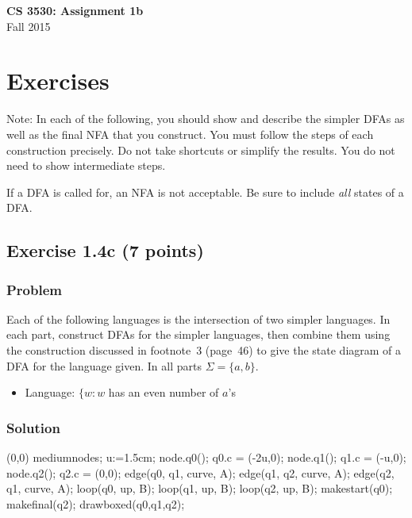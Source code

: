 \documentclass{article}
\begin{document}
\begin{empfile}

\begin{center}
\textbf{\Large CS 3530: Assignment 1b} \\[2mm]
Fall 2015
\end{center}

\raggedright

\section*{Exercises}

Note: In each of the following, you should show and describe the
simpler DFAs as well as the final NFA that you construct. You must
follow the steps of each construction precisely. Do not take
shortcuts or simplify the results. You do not need to show
intermediate steps.

If a DFA is called for, an NFA is not acceptable. Be sure to include
\textit{all} states of a DFA.

\subsection*{Exercise 1.4c (7 points)}

\subsubsection*{Problem}

Each of the following languages is the intersection of two simpler
languages. In each part, construct DFAs for the simpler languages,
then combine them using the construction discussed in footnote~3
(page~46) to give the state diagram of a DFA for the language given.
In all parts $\Sigma=\{a,b\}$.

\begin{itemize}
\item Language: $\{w:w$ has an even number of $a$'s
\end{itemize}

\subsubsection*{Solution}
	\begin{center}
	\begin{emp}(0,0)
	mediumnodes;
	u:=1.5cm;
	node.q0(); q0.c = (-2u,0);
	node.q1(); q1.c = (-u,0);
	node.q2(); q2.c = (0,0);
	edge(q0, q1, curve, A);
	edge(q1, q2, curve, A);
	edge(q2, q1, curve, A);
	loop(q0, up, B);
	loop(q1, up, B);
	loop(q2, up, B);
	makestart(q0);
	makefinal(q2);
	drawboxed(q0,q1,q2);
	\end{emp}
	\end{center}
	

\end{empfile}
\end{document}

